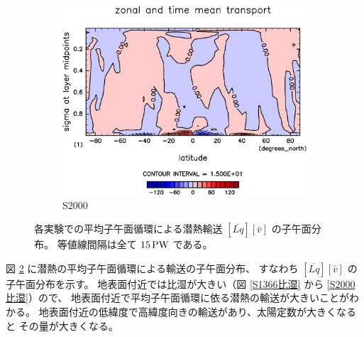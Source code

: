 \documentclass[body]{subfiles}
\begin{document}
\begin{figure}[t]
\begin{subfigure}{.4\textwidth}
		\includegraphics[width=\columnwidth]{S2000/MeriHeatTransTest@latentEn_M,time=7300:7665-crop-rotate.pdf}
		\caption{S2000}\label{潜熱平均子午面循環S2000}
	\end{subfigure}
	\caption[各実験での平均子午面循環による潜熱輸送の子午面分布]{
		各実験での平均子午面循環による潜熱輸送 \([\overline{Lq}][\bar v]\) の子午面分布。
		等値線間隔は全て \(15\hmu{PW}\) である。
	}\label{潜熱平均子午面循環}
\end{figure}

\afterpage{\clearpage}

図 \ref{潜熱平均子午面循環} に潜熱の平均子午面循環による輸送の子午面分布、
すなわち \([\overline{Lq}][\bar v]\) の子午面分布を示す。
地表面付近では比湿が大きい（図 \ref{S1366比湿} から \ref{S2000比湿}）ので、
地表面付近で平均子午面循環に依る潜熱の輸送が大きいことがわかる。
地表面付近の低緯度で高緯度向きの輸送があり、太陽定数が大きくなると
その量が大きくなる。
\end{document}
